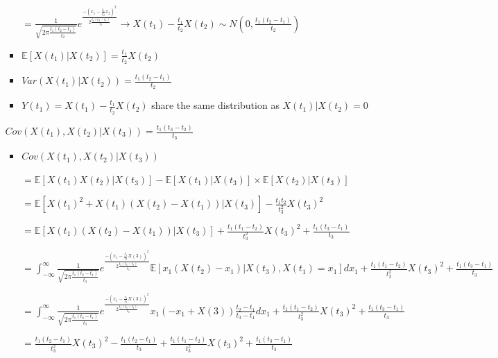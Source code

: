 \documentclass[a4paper]{article}
\begin{document}
\begin{itemize}
\begin{itemize}
\begin{itemize}
\begin{itemize}
                                $= \frac{1}{\sqrt{2\pi \frac{t_1(t_2 - t_1)}{t_2}}}e^{\frac{-(x_1 - \frac{t_1}{t_2}x_2)^2}{2\frac{t_1(t_2 - t_1)}{t_2}}} \rightarrow X(t_1) - \frac{t_1}{t_2}X(t_2) \sim N(0, \frac{t_1(t_2 - t_1)}{t_2})$
                            \item $\mathbb{E}[X(t_1)|X(t_2)] = \frac{t_1}{t_2}X(t_2)$
                            \item $\mathit{Var}(X(t_1)|X(t_2)) = \frac{t_1(t_2 - t_1)}{t_2}$
                            \item $Y(t_1) = X(t_1) - \frac{t_1}{t_2} X(t_2)$ share the same distribution as $X(t_1) |X(t_2) = 0$
                        \end{itemize}
                        $\mathit{Cov}(X(t_1), X(t_2)|X(t_3)) = \frac{t_1(t_3-t_2)}{t_3}$
                        \begin{itemize}
                            \item $\mathit{Cov}(X(t_1), X(t_2)|X(t_3))$

                                $= \mathbb{E}[X(t_1)X(t_2)|X(t_3)] - \mathbb{E}[X(t_1)|X(t_3)] \times \mathbb{E}[X(t_2)|X(t_3)]$

                                $= \mathbb{E}[X(t_1)^2 + X(t_1)(X(t_2)-X(t_1))|X(t_3)] - \frac{t_1 t_2}{t_3^2} X(t_3)^2$

                                $= \mathbb{E}[X(t_1)(X(t_2)-X(t_1))|X(t_3)] + \frac{t_1 (t_1 - t_2)}{t_3^2} X(t_3)^2 + \frac{t_1(t_3- t_1)}{t_3}$

                                {\tiny
                                $= \int_{-\infty}^{\infty} \frac{1}{\sqrt{2\pi \frac{t_1(t_3 - t_1)}{t_3}}}e^{\frac{-(x_1 - \frac{t_1}{t_3}X(3))^2}{2\frac{t_1(t_3 - t_1)}{t_3}}} \mathbb{E}[x_1(X(t_2)-x_1)|X(t_3), X(t_1) = x_1] dx_1 + \frac{t_1 (t_1 - t_2)}{t_3^2} X(t_3)^2 + \frac{t_1(t_3- t_1)}{t_3}$
                                }

                                $= \int_{-\infty}^{\infty} \frac{1}{\sqrt{2\pi \frac{t_1(t_3 - t_1)}{t_3}}}e^{\frac{-(x_1 - \frac{t_1}{t_3}X(3))^2}{2\frac{t_1(t_3 - t_1)}{t_3}}} x_1(-x_1 + X(3))\frac{t_2-t_1}{t_3-t_1} dx_1 + \frac{t_1 (t_1 - t_2)}{t_3^2} X(t_3)^2 + \frac{t_1(t_3- t_1)}{t_3}$

                                $= \frac{t_1(t_2 - t_1)}{t_3^2}X(t_3)^2 - \frac{t_1(t_2-t_1)}{t_3} + \frac{t_1 (t_1 - t_2)}{t_3^2} X(t_3)^2 + \frac{t_1(t_3- t_1)}{t_3}$



\end{itemize}
\end{itemize}
\end{itemize}
\end{itemize}
\end{document}
